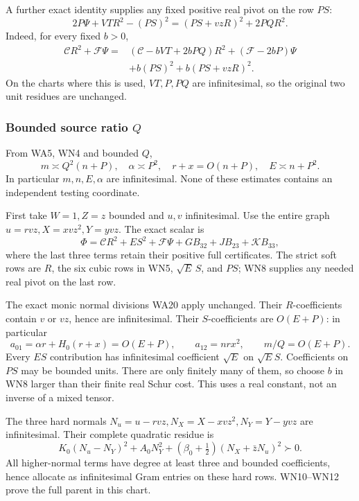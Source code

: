 A further exact identity supplies any fixed positive real pivot
on the row \(PS\):
\[
 2P\Psi+VT R^2-(PS)^2=(PS+vzR)^2+2PQR^2.
 \tag{WN7}
\]
Indeed, for every fixed \(b>0\),
\[
\begin{split}
 \mathcal C R^2+\mathcal F\Psi={}&
 (\mathcal C-bVT+2bPQ)R^2+(\mathcal F-2bP)\Psi\\
 &+b(PS)^2+b(PS+vzR)^2.
\end{split}\tag{WN8}
\]
On the charts where this is used, \(VT,P,PQ\) are infinitesimal,
so the original two unit residues are unchanged.

\subsubsection*{Bounded source ratio \(Q\)}

From WA5, WN4 and bounded \(Q\),
\[
 m\asymp Q^2(n+P),\quad \alpha\asymp P^2,\quad
 r+x=O(n+P),\quad E\asymp n+P^2.
 \tag{WN9}
\]
In particular \(m,n,E,\alpha\) are infinitesimal. None of these
estimates contains an independent testing coordinate.

First take \(W=1,Z=z\) bounded and \(u,v\) infinitesimal. Use the
entire graph \(u=rvz,X=xvz^2,Y=yvz\). The exact scalar is
\[
 \Phi=\mathcal CR^2+ES^2+\mathcal F\Psi
          +GB_{32}+JB_{23}+\mathcal K B_{33},
 \tag{WN10}
\]
where the last three terms retain their positive full certificates.
The strict soft rows are \(R\), the six cubic rows in WN5,
\(\sqrt E\,S\), and \(PS\); WN8 supplies any needed real pivot
on the last row.

The exact monic normal divisions WA20 apply unchanged.
Their \(R\)-coefficients contain \(v\) or \(vz\), hence are
infinitesimal. Their \(S\)-coefficients are \(O(E+P)\):
in particular
\[
 a_{01}=\alpha r+H_0(r+x)=O(E+P),\qquad
 a_{12}=nr x^2,\qquad m/Q=O(E+P).
 \tag{WN11}
\]
Every \(ES\) contribution has infinitesimal coefficient \(\sqrt E\)
on \(\sqrt E S\). Coefficients on \(PS\) may be bounded units.
There are only finitely many of them, so choose \(b\) in WN8
larger than their finite real Schur cost. This uses a real constant,
not an inverse of a mixed tensor.

The three hard normals
\(N_u=u-rvz,N_X=X-xvz^2,N_Y=Y-yvz\) are infinitesimal.
Their complete quadratic residue is
\[
 K_0(N_u-N_Y)^2+A_0N_Y^2+
          (\beta_0+\tfrac12)(N_X+\bar zN_u)^2\succ0.
 \tag{WN12}
\]
All higher-normal terms have degree at least three and bounded
coefficients, hence allocate as infinitesimal Gram entries on these
hard rows. WN10--WN12 prove the full parent in this chart.

